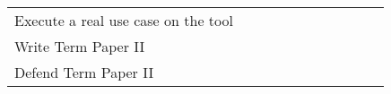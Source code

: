 \begin{table}
\begin{tabular}{p{3cm}|l|llll|lll|ll}
    Execute a real use case on the tool                                                                                               &                                      &                                      &                                      &                                      &                                      &                                      &                                      & {\cellcolor[rgb]{0.753,0.753,0.753}} & {\cellcolor[rgb]{0.753,0.753,0.753}} &                                      \\
    \rowcolor[rgb]{0.914,0.914,0.914} Write Term Paper II                                                                             &                                      &                                      &                                      &                                      &                                      &                                      &                                      & {\cellcolor[rgb]{0.753,0.753,0.753}} & {\cellcolor[rgb]{0.753,0.753,0.753}} & {\cellcolor[rgb]{0.753,0.753,0.753}} \\
    Defend Term Paper II                                                                                                              &                                      &                                      &                                      &                                      &                                      &                                      &                                      &                                      &                                      & {\cellcolor[rgb]{0.753,0.753,0.753}} \\
    \toprule
  \end{tabular}
\end{table}